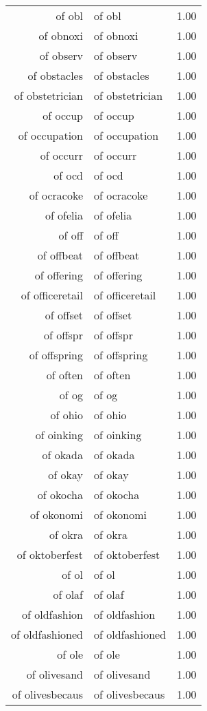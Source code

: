 \begin{table}[ht]
\begin{tabular}{rlr}
  of obl & of obl & 1.00 \\ 
  of obnoxi & of obnoxi & 1.00 \\ 
  of observ & of observ & 1.00 \\ 
  of obstacles & of obstacles & 1.00 \\ 
  of obstetrician & of obstetrician & 1.00 \\ 
  of occup & of occup & 1.00 \\ 
  of occupation & of occupation & 1.00 \\ 
  of occurr & of occurr & 1.00 \\ 
  of ocd & of ocd & 1.00 \\ 
  of ocracoke & of ocracoke & 1.00 \\ 
  of ofelia & of ofelia & 1.00 \\ 
  of off & of off & 1.00 \\ 
  of offbeat & of offbeat & 1.00 \\ 
  of offering & of offering & 1.00 \\ 
  of officeretail & of officeretail & 1.00 \\ 
  of offset & of offset & 1.00 \\ 
  of offspr & of offspr & 1.00 \\ 
  of offspring & of offspring & 1.00 \\ 
  of often & of often & 1.00 \\ 
  of og & of og & 1.00 \\ 
  of ohio & of ohio & 1.00 \\ 
  of oinking & of oinking & 1.00 \\ 
  of okada & of okada & 1.00 \\ 
  of okay & of okay & 1.00 \\ 
  of okocha & of okocha & 1.00 \\ 
  of okonomi & of okonomi & 1.00 \\ 
  of okra & of okra & 1.00 \\ 
  of oktoberfest & of oktoberfest & 1.00 \\ 
  of ol & of ol & 1.00 \\ 
  of olaf & of olaf & 1.00 \\ 
  of oldfashion & of oldfashion & 1.00 \\ 
  of oldfashioned & of oldfashioned & 1.00 \\ 
  of ole & of ole & 1.00 \\ 
  of olivesand & of olivesand & 1.00 \\ 
  of olivesbecaus & of olivesbecaus & 1.00 \\ 

\end{tabular}
\end{table}
